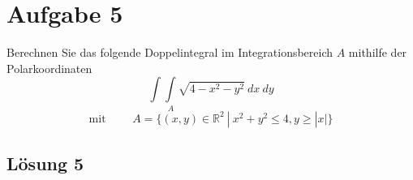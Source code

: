 \documentclass[main.tex]{subfiles}
\begin{document}
\section{Aufgabe 5}
Berechnen Sie das folgende Doppelintegral im Integrationsbereich $A$ mithilfe der Polarkoordinaten
\[
\int \int \limits_{A} \sqrt{4 - x^2 - y^2} \ dx \ dy
\]
\[ 
\mbox{mit } \qquad 
A = \{ (x,y) \in \mathbb{R}^2 \ | \ x^2 + y^2 \leq 4, y \geq |x| \}
\]

\subsection{Lösung 5}
\end{document}
